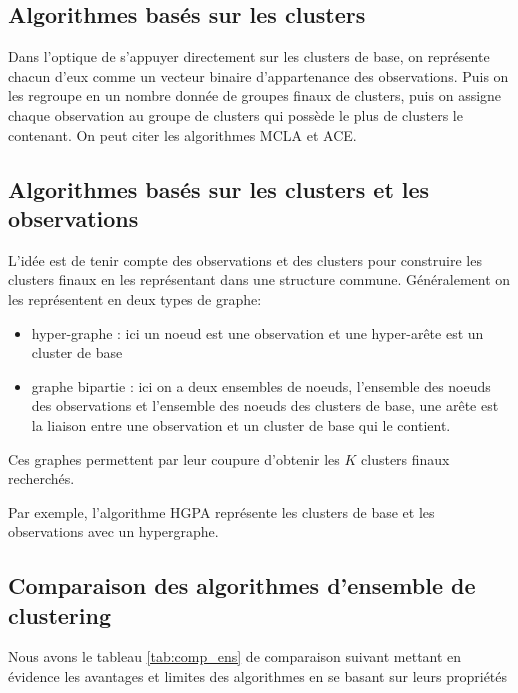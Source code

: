       
  	  \subsection{Algorithmes basés sur les clusters}
      
  	  Dans l'optique de s'appuyer directement sur les clusters de base, on représente chacun d'eux comme un vecteur binaire d'appartenance des observations.
  	  Puis on les regroupe en un nombre donnée de groupes finaux de clusters,
  	  puis on assigne chaque observation au groupe de clusters qui possède le plus de clusters le contenant.
  	  On peut citer les algorithmes \acrfull{MCLA}\cite{strehl2002cluster} et \acrfull{ACE}\cite{alqurashi2019clustering}.
      
  	  \subsection{Algorithmes basés sur les clusters et les observations}
      
  	  L'idée est de tenir compte des observations et des clusters pour construire les clusters finaux en les représentant dans une structure commune.
  	  Généralement on les représentent en deux types de graphe:
  	  \begin{itemize}
  		  \item hyper-graphe :
  		  ici un noeud est une observation et une hyper-arête est un cluster de base
  		  \item graphe bipartie :
  		  ici on a deux ensembles de noeuds, l'ensemble des noeuds des observations et l'ensemble des noeuds des clusters de base,
  		  une arête est la liaison entre une observation et un cluster de base qui le contient.
  	  \end{itemize}
  	  Ces graphes permettent par leur coupure d'obtenir les $K$ clusters finaux recherchés.
    
  	  Par exemple, l'algorithme HGPA \cite{strehl2002cluster} représente les clusters de base et les observations avec un hypergraphe.

      
  	  \subsection{Comparaison des algorithmes d'ensemble de clustering}

  	  Nous avons le tableau \ref{tab:comp_ens} de comparaison suivant mettant en évidence les avantages et limites des algorithmes en se basant sur leurs propriétés


